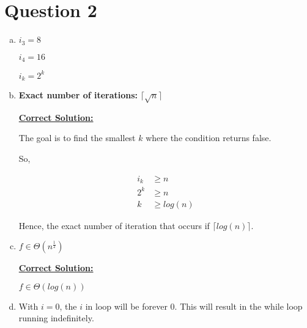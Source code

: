 \documentclass[12pt]{article}
\begin{document}
\section*{Question 2}
\begin{enumerate}[a.]
    \item

    $i_3 = 8$

    $i_4 = 16$

    $i_k = 2^k$

    \item

    \textbf{Exact number of iterations:} $\lceil \sqrt{n} \rceil$

    \bigskip

    \underline{\textbf{Correct Solution:}}

    The goal is to find the smallest $k$ where the condition returns false.

    \bigskip

    So,

    \begin{align}
        i_k &\geq n\\
        2^k &\geq n\\
        k &\geq log(n)
    \end{align}

    Hence, the exact number of iteration that occurs if $\lceil log(n) \rceil$.

    \item

    $f \in \Theta (n^{\frac{1}{2}})$

    \bigskip

    \underline{\textbf{Correct Solution:}}

    $f \in \Theta (log(n))$

    \item

    With $i = 0$, the $i$ in loop will be forever 0. This will result in the while
    loop running indefinitely.


\end{enumerate}
\end{document}
